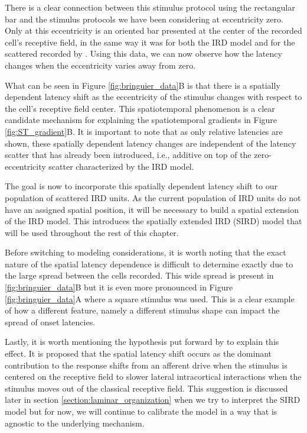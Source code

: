 \documentclass[phd,ianc,twoside]{infthesis}
\begin{document}
There is a clear connection between this stimulus protocol using the
rectangular bar and the stimulus protocols we have been considering at
eccentricity zero. Only at this eccentricity is an oriented bar presented at
the center of the recorded cell's receptive field, in the same way it
was for both the IRD model and for the scattered recorded by
\citet{nowak_visneuro95}. Using this data, we can now observe how the
latency changes when the eccentricity varies away from zero.

What can be seen in Figure \ref{fig:bringuier_data}B is that there is a
spatially dependent latency shift as the eccentricity of the stimulus
changes with respect to the cell's receptive field center. This
spatiotemporal phenomenon is a clear candidate mechanism for explaining
the spatiotemporal gradients in Figure \ref{fig:ST_gradient}B. It is
important to note that as only relative latencies are shown, these
spatially dependent latency changes are independent of the latency
scatter that has already been introduced, i.e., additive on top of the
zero-eccentricity scatter characterized by the IRD model.

The goal is now to incorporate this spatially dependent latency shift to
our population of scattered IRD units. As the current population of IRD
units do not have an assigned spatial position, it will be necessary to
build a spatial extension of the IRD model. This introduces the
spatially extended IRD (SIRD) model that will be used throughout the
rest of this chapter.

Before switching to modeling considerations, it is worth noting that the
exact nature of the spatial latency dependence is difficult to determine
exactly due to the large spread between the cells recorded. This wide
spread is present in \ref{fig:bringuier_data}B but it is even more
pronounced in Figure \ref{fig:bringuier_data}A where a square stimulus
was used. This is a clear example of how a different feature, namely a
different stimulus shape can impact the spread of onset latencies.

Lastly, it is worth mentioning the hypothesis put forward by
\citet{bringuier_science99} to explain this effect.  It is proposed that
the spatial latency shift occurs as the dominant contribution to the
response shifts from an afferent drive when the stimulus is centered on
the receptive field to slower lateral intracortical interactions when
the stimulus moves out of the classical receptive field. This suggestion
is discussed later in section \ref{section:laminar_organization} when we
try to interpret the SIRD model but for now, we will continue to
calibrate the model in a way that is agnostic to the underlying
mechanism.
\end{document}
